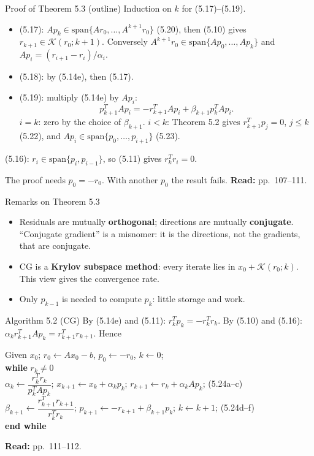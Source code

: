 \documentclass[12pt,aspectratio=169]{beamer}
\newcommand{\readpp}[1]{{\color{red!80!black}\textbf{Read:} #1}}
\newcommand{\algblock}[1]{\begin{block}{}#1\end{block}}
\newcommand{\kw}[1]{\textbf{#1}}
\newcommand{\ind}{\hspace*{1.2em}}
\newcommand{\K}{\mathcal{K}}
\begin{document}
\begin{frame}{Proof of Theorem 5.3 (outline)}
  Induction on $k$ for (5.17)--(5.19).
  \begin{itemize}
    \item (5.17): $Ap_k\in\mathrm{span}\{Ar_0,\dots,A^{k+1}r_0\}$ (5.20), then (5.10) gives
      $r_{k+1}\in\K(r_0;k+1)$. Conversely $A^{k+1}r_0\in\mathrm{span}\{Ap_0,\dots,Ap_k\}$
      and $Ap_i=(r_{i+1}-r_i)/\alpha_i$.
    \item (5.18): by (5.14e), then (5.17).
    \item (5.19): multiply (5.14e) by $Ap_i$:
      \begin{equation}
        p_{k+1}^TAp_i = -r_{k+1}^TAp_i+\beta_{k+1}p_k^TAp_i. \tag{5.21}
      \end{equation}
      $i=k$: zero by the choice of $\beta_{k+1}$.
      $i<k$: Theorem 5.2 gives $r_{k+1}^Tp_j=0$, $j\le k$ (5.22), and $Ap_i\in\mathrm{span}\{p_0,\dots,p_{i+1}\}$ (5.23).
  \end{itemize}
  (5.16): $r_i\in\mathrm{span}\{p_i,p_{i-1}\}$, so (5.11) gives $r_k^Tr_i=0$.

  \alert{The proof needs $p_0=-r_0$.} With another $p_0$ the result fails.
  \readpp{pp.~107--111.}
\end{frame}

\begin{frame}{Remarks on Theorem 5.3}
  \begin{itemize}
    \item Residuals are mutually \textbf{orthogonal}; directions are mutually \textbf{conjugate}.
      ``Conjugate gradient'' is a misnomer: it is the directions, not the gradients, that are conjugate.
    \item CG is a \textbf{Krylov subspace method}: every iterate lies in $x_0+\K(r_0;k)$.
      This view gives the convergence rate.
    \item Only $p_{k-1}$ is needed to compute $p_k$: little storage and work.
  \end{itemize}
\end{frame}

\begin{frame}{Algorithm 5.2 (CG)}
  By (5.14e) and (5.11): $r_k^Tp_k=-r_k^Tr_k$. By (5.10) and (5.16): $\alpha_kr_{k+1}^TAp_k = r_{k+1}^Tr_{k+1}$. Hence
  \algblock{
    Given $x_0$; $r_0\leftarrow Ax_0-b$, $p_0\leftarrow-r_0$, $k\leftarrow0$;\\
    \kw{while} $r_k\neq0$\\
    \ind $\alpha_k\leftarrow\dfrac{r_k^Tr_k}{p_k^TAp_k}$; \quad
      $x_{k+1}\leftarrow x_k+\alpha_kp_k$; \quad
      $r_{k+1}\leftarrow r_k+\alpha_kAp_k$; \hfill (5.24a--c)\\[1ex]
    \ind $\beta_{k+1}\leftarrow\dfrac{r_{k+1}^Tr_{k+1}}{r_k^Tr_k}$; \quad
      $p_{k+1}\leftarrow-r_{k+1}+\beta_{k+1}p_k$; \quad $k\leftarrow k+1$; \hfill (5.24d--f)\\
    \kw{end while}
  }
  \readpp{pp.~111--112.}
\end{frame}
\end{document}
